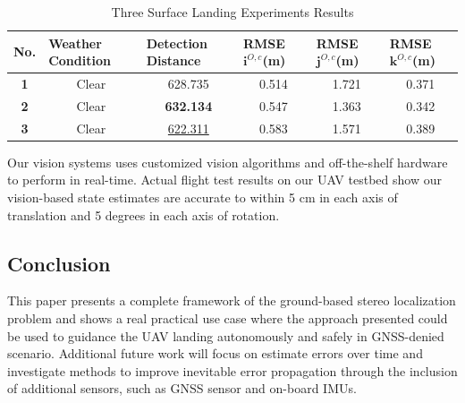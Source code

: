 \begin{table}[!th]
	\centering
	\caption{Three Surface Landing Experiments Results}
	\label{lab:three_ship_landing}
	\begin{tabular}{cccccc}
		\hline
		\multicolumn{1}{l}{\textbf{No.}} & \multicolumn{1}{l}{\textbf{Weather Condition}} & \multicolumn{1}{l}{\textbf{Detection Distance}} & \multicolumn{1}{l}{\textbf{RMSE $\mathbf{i}^{O,c}$(m)}} & \multicolumn{1}{l}{\textbf{RMSE $\mathbf{j}^{O,c}$(m)}} & \multicolumn{1}{l}{\textbf{RMSE $\mathbf{k}^{O,c}$(m)}} \\ \hline
		\textbf{1} & Clear & 628.735 & 0.514 & 1.721 & 0.371 \\
		\textbf{2} & Clear & \textbf{632.134} & 0.547 & 1.363 & 0.342 \\
		\textbf{3} & Clear & \underline{622.311} & 0.583 & 1.571 & 0.389 \\ \hline
	\end{tabular}
\end{table}

Our vision systems uses customized vision algorithms and off-the-shelf hardware to perform in real-time. Actual flight test results on our UAV testbed show our vision-based state estimates are accurate to within 5 cm in each axis of translation and 5 degrees in each axis of rotation.

\subsection{Conclusion}
This paper presents a complete framework of the ground-based stereo localization  problem and shows a real practical use case where the approach
presented could be used to guidance the UAV landing autonomously and safely in GNSS-denied scenario. Additional future work will focus on estimate errors over time and investigate methods to improve inevitable error propagation through the inclusion of additional sensors, such as GNSS sensor and on-board IMUs.





